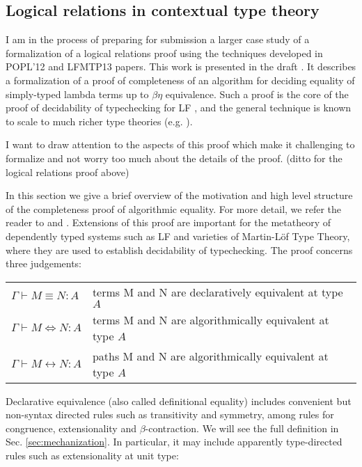 \documentclass{article}
\begin{document}
\subsection{Logical relations in contextual type theory}
I am in the process of preparing for submission a larger case study of a formalization
of a logical relations proof using the techniques developed in 
POPL'12 and LFMTP13 papers. This work is presented in the draft
\citep{Cave14}. It describes a formalization of a proof of
completeness of an algorithm for deciding equality of simply-typed
lambda terms up to $\beta\eta$ equivalence. Such a proof is the core
of the proof of decidability of typechecking for LF
\cite{Harper03tocl}, and the general technique is known to scale to
much richer type theories (e.g. \cite{Abel11}).

I want to draw attention to the aspects of this proof which make it
challenging to formalize and not worry too much about the details of
the proof. (ditto for the logical relations proof above)

In this
section we give a brief overview of the motivation and high level structure of
the completeness proof of algorithmic equality. For more detail, we refer the
reader to \cite{Crary:ATAPL} and \cite{Harper03tocl}. Extensions of 
this proof are important for the metatheory of dependently typed systems such as
LF and varieties of Martin-L\"of 
Type Theory, where they are used to establish decidability of typechecking. The proof concerns three judgements:

\begin{center}
  \begin{tabular}{@{}l@{~~~}l@{}}
$\Gamma \vdash M \equiv N : A$ & terms M and N are declaratively equivalent at
type $A$ \\
$\Gamma \vdash M \Leftrightarrow N : A$ & terms M and N are
algorithmically equivalent at type $A$ \\
$\Gamma \vdash M \leftrightarrow N : A$ & paths M and N are
algorithmically equivalent at type $A$ \\
  \end{tabular}
\end{center}

Declarative equivalence (also called definitional equality) includes convenient but non-syntax directed rules
such as transitivity and symmetry, among rules for congruence,
extensionality and $\beta$-contraction. We will see the full definition
in Sec. \ref{sec:mechanization}. In particular, it may include
apparently type-directed rules such as extensionality at unit type:
\end{document}
